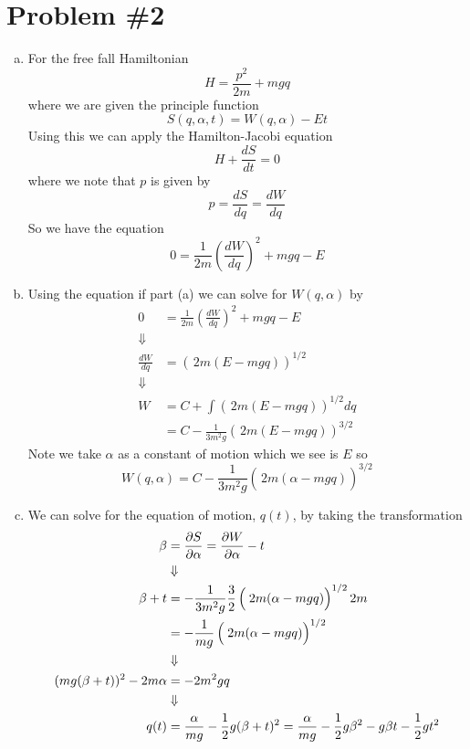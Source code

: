 \documentclass[11pt]{article}
\numberwithin{equation}{section}
\begin{document}
\section{Problem \#2}
\begin{enumerate}[(a)]
\item For the free fall Hamiltonian
$$H = \frac{p^2}{2m} + mgq$$
where we are given the principle function
$$S(q,\alpha,t) = W(q,\alpha) - Et$$
Using this we can apply the Hamilton-Jacobi equation 
$$H + \frac{dS}{dt} = 0$$
where we note that $p$ is given by 
$$p = \frac{dS}{dq} = \frac{dW}{dq}$$
So we have the equation
$$0 = \frac{1}{2m}\left(\frac{dW}{dq}\right)^2 + mgq - E$$

\item Using the equation if part (a) we can solve for $W(q,\alpha)$ by 
\begin{align*}
0 &= \frac{1}{2m}\left(\frac{dW}{dq}\right)^2 + mgq - E\\
\Downarrow\\
\frac{dW}{dq} &= \left(\frac{}{}2m(E-mgq)\right)^{1/2}\\
\Downarrow\\
W &= C + \int\left(\frac{}{}2m(E-mgq)\right)^{1/2}dq\\
&= C - \frac{1}{3m^2g}\left(\frac{}{}2m(E-mgq)\right)^{3/2}
\end{align*}
Note we take $\alpha$ as a constant of motion which we see is $E$ so
$$W(q,\alpha) = C - \frac{1}{3m^2g}\left(\frac{}{}2m(\alpha-mgq)\right)^{3/2}$$

\item
We can solve for the equation of motion, $q(t)$, by taking the transformation
\begin{align*}
\beta &= \frac{\partial{S}}{\partial{\alpha}} = \frac{\partial{W}}{\partial{\alpha}} - t\\
&\Downarrow\\
\beta +t &= - \frac{1}{3m^2g}\frac{3}{2}\left(\frac{}{}2m(\alpha-mgq)\right)^{1/2}2m\\
&= - \frac{1}{mg}\left(\frac{}{}2m(\alpha-mgq)\right)^{1/2}\\
&\Downarrow\\
(mg(\beta+t))^2-2m\alpha &= -2m^2gq\\
&\Downarrow\\
q(t) &= \frac{\alpha}{mg} - \frac{1}{2}g(\beta+t)^2 =  \frac{\alpha}{mg} - \frac{1}{2}g\beta^2 - g\beta{t} - \frac{1}{2}gt^2
\end{align*}


\end{enumerate}
\end{document}
